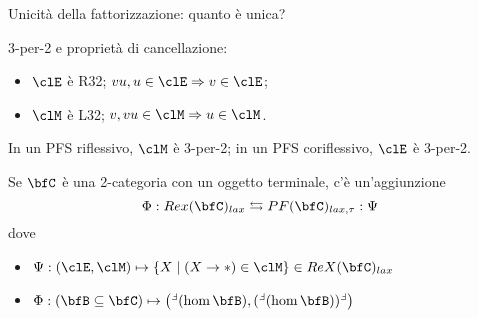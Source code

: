 \documentclass{amsart}
\def\lp{\mathrel{\mathpalette{\relax}{\Finv}}}
\begin{document}
\begin{proposition}
  Unicità della fattorizzazione: quanto è unica?
\end{proposition}
\begin{proposition}
  3-per-2 e proprietà di cancellazione:
  \begin{itemize}
    \item $\clE$ è R32; $vu,u\in\clE\To v \in\clE$;
    \item $\clM$ è L32; $v, vu\in\clM\To u\in\clM$.
  \end{itemize}
  In un PFS riflessivo, $\clM$ è 3-per-2; in un PFS coriflessivo, $\clE$ è 3-per-2.
\end{proposition}
\begin{theorem}
  Se $\bfC$ è una 2-categoria con un oggetto terminale, c'è un'aggiunzione
  \[
  \Phi : Rex(\bfC)_{lax} \leftrightarrows PF(\bfC)_{lax, \tau} : \Psi  
  \]
  dove 
  \begin{itemize}
    \item $\Psi : (\clE,\clM)\mapsto \{X \mid (X\to *)\in\clM\} \in ReX(\bfC)_{lax}$
    \item $\Phi : (\bfB\subseteq \bfC) \mapsto \big({}^{\lp}(\hom\bfB), ({}^{\lp}(\hom\bfB))^{\lp}\big)$
  \end{itemize}
\end{theorem}
\end{document}
